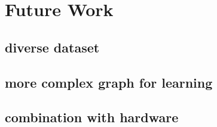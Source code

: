 \chapter{Future Work}\label{chapter:futurework}


\section{diverse dataset}

\section{more complex graph for learning}

\section{combination with hardware}
